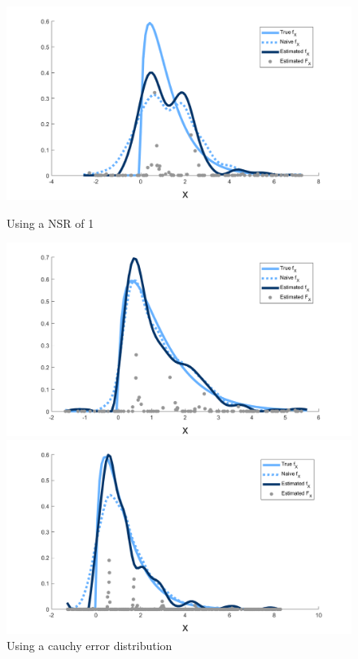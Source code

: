 \begin{figure}
	\begin{minipage}{0.5\textwidth}
		\centering
		\includegraphics[width = \textwidth]{Figures/Deconvolution/fixed_masses_example_NSR1.png}
		\caption{Using a NSR of 1}
		\label{fig:fixed masses example NSR1}
	\end{minipage}
	\begin{minipage}{0.5\textwidth}
		\centering
		\includegraphics[width = \textwidth]{Figures/Deconvolution/fixed_masses_example_Ucauchy.png}
		\caption{Using a cauchy error distribution}
		\label{fig:fixed masses example Ucauchy}
	\end{minipage}
	\begin{minipage}{0.5\textwidth}
		\centering
		\includegraphics[width = \textwidth]{Figures/Deconvolution/fixed_masses_example_n10000.png}

\end{minipage}
\end{figure}

